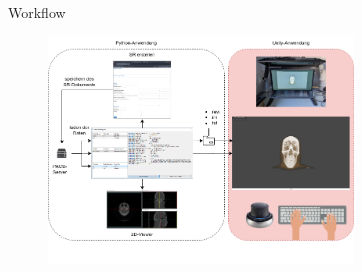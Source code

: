 \documentclass[final,hyperref={pdfpagelabels=false}]{beamer}
\begin{document}
\begin{frame}[t]


\begin{columns}[t] %

\begin{column}{.025\textwidth}\end{column} %

\begin{column}{.465\textwidth} %


\begin{block}{Workflow}

    \begin{figure}
        \centering
        
        \includegraphics[width=0.76\textwidth]{workflow}
                
    \end{figure}
%
% 
    

\end{block}
\end{column}
\end{columns}
\end{frame}
\end{document}
